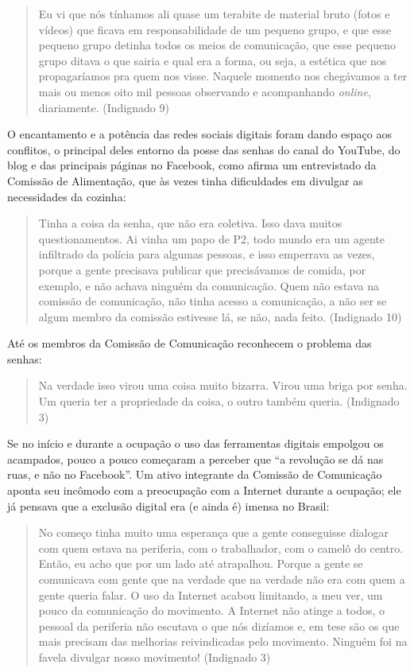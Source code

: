 \begin{quote}
Eu vi que nós tínhamos ali quase um terabite de material bruto
(fotos e vídeos) que ficava em responsabilidade de um pequeno
grupo, e que esse pequeno grupo detinha todos os meios de comunicação,
que esse pequeno grupo ditava o que sairia e qual era a forma, ou seja,
a estética que nos propagaríamos pra quem nos visse. Naquele momento nos
chegávamos a ter mais ou menos oito mil pessoas observando e
acompanhando \emph{online}, diariamente. (Indignado 9)
\end{quote}

O encantamento e a potência das redes sociais digitais foram dando
espaço aos conflitos, o principal deles entorno da posse das senhas do
canal do YouTube, do blog e das principais páginas no Facebook, como
afirma um entrevistado da Comissão de Alimentação, que às vezes tinha
dificuldades em divulgar as necessidades da cozinha:

\begin{quote}
Tinha a coisa da senha, que não era coletiva. Isso dava muitos
questionamentos. Ai vinha um papo de P2, todo mundo era um agente
infiltrado da polícia para algumas pessoas, e isso emperrava as vezes,
porque a gente precisava publicar que precisávamos de comida, por
exemplo, e não achava ninguém da comunicação. Quem não estava na
comissão de comunicação, não tinha acesso a comunicação, a não ser se
algum membro da comissão estivesse lá, se não, nada feito. (Indignado
10)
\end{quote}

Até os membros da Comissão de Comunicação reconhecem o problema das
senhas:

\begin{quote}
Na verdade isso virou uma coisa muito bizarra. Virou uma briga por
senha. Um queria ter a propriedade da coisa, o outro também queria.
(Indignado 3)
\end{quote}

Se no início e durante a ocupação o uso das ferramentas digitais
empolgou os acampados, pouco a pouco começaram a perceber que ``a
revolução se dá nas ruas, e não no Facebook''. Um ativo integrante da
Comissão de Comunicação aponta seu incômodo com a preocupação com a
Internet durante a ocupação; ele já pensava que a exclusão digital era
(e ainda é) imensa no Brasil:

\begin{quote}
No começo tinha muito uma esperança que a gente conseguisse
dialogar com quem estava na periferia, com o trabalhador, com o camelô
do centro. Então, eu acho que por um lado até atrapalhou. Porque a gente
se comunicava com gente que na verdade que na verdade não era com quem a
gente queria falar. O uso da Internet acabou limitando, a meu ver, um
pouco da comunicação do movimento. A Internet não atinge a todos, o
pessoal da periferia não escutava o que nós dizíamos e, em tese são os
que mais precisam das melhorias reivindicadas pelo movimento. Ninguém
foi na favela divulgar nosso movimento! (Indignado 3)
\end{quote}

